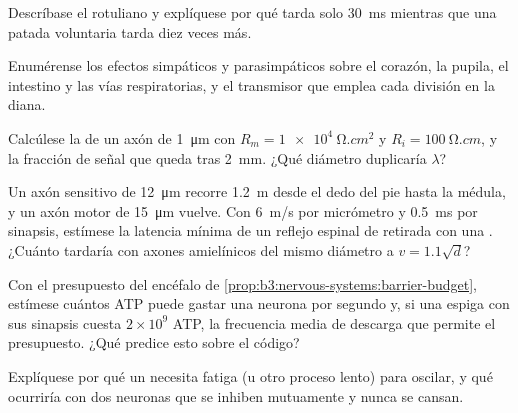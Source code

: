 \begin{exercise}[$\star$]\label{exo:b3:nervous-systems:3}
Descríbase el  rotuliano y explíquese por qué tarda solo
\qty{30}{ms} mientras que una patada voluntaria tarda diez veces más.
\end{exercise}

\begin{exercise}[$\star$]\label{exo:b3:nervous-systems:4}
Enumérense los efectos simpáticos y parasimpáticos sobre el corazón, la
pupila, el intestino y las vías respiratorias, y el transmisor que
emplea cada división en la diana.
\end{exercise}

\begin{exercise}[$\star\star$]\label{exo:b3:nervous-systems:5}
Calcúlese la  de un axón de \qty{1}{\micro m} con $R_{m}
= \qty{1e4}{\ohm.cm^2}$ y $R_{i} = \qty{100}{\ohm.cm}$, y la fracción
de señal que queda tras \qty{2}{mm}. ¿Qué diámetro duplicaría
$\lambda$?
\end{exercise}

\begin{exercise}[$\star\star$]\label{exo:b3:nervous-systems:6}
Un axón sensitivo de \qty{12}{\micro m} recorre \qty{1.2}{m} desde el
dedo del pie hasta la médula, y un axón motor de \qty{15}{\micro m}
vuelve. Con \qty{6}{m/s} por micrómetro y \qty{0.5}{ms} por sinapsis,
estímese la latencia mínima de un reflejo espinal de retirada con una
. ¿Cuánto tardaría con axones amielínicos del mismo
diámetro a $v = 1.1\sqrt{d}$?
\end{exercise}

\begin{exercise}[$\star\star$]\label{exo:b3:nervous-systems:7}
Con el presupuesto del encéfalo de
\cref{prop:b3:nervous-systems:barrier-budget}, estímese cuántos ATP
puede gastar una neurona por segundo y, si una espiga con sus sinapsis
cuesta $2\times 10^{9}$ ATP, la frecuencia media de descarga que
permite el presupuesto. ¿Qué predice esto sobre el código?
\end{exercise}

\begin{exercise}[$\star\star$]\label{exo:b3:nervous-systems:8}
Explíquese por qué un  necesita fatiga (u otro
proceso lento) para oscilar, y qué ocurriría con dos neuronas que se
inhiben mutuamente y nunca se cansan.
\end{exercise}

